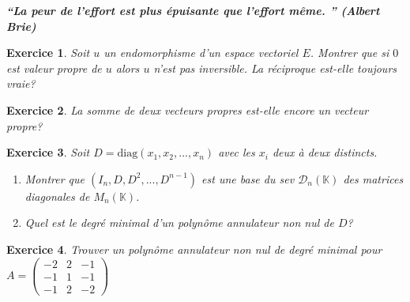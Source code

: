 \documentclass[12pt,a4paper]{article}
\newcommand{\K}{\mathbb{K} }
\newcommand{\diag}{\mathrm{diag}}
\theoremstyle{break}
\theoremstyle{break}
\newtheorem{Exo}{Exercice}
\begin{document}
\emph{\textbf{“La peur de l'effort est plus épuisante que l'effort même. ” (Albert Brie)}}



\begin{Exo}
Soit $u$ un endomorphisme d'un espace vectoriel $E$. Montrer que si $0$ est valeur propre de $u$ alors $u$ n'est pas inversible. La réciproque est-elle toujours vraie?
\end{Exo}


\begin{Exo}
	La somme de deux vecteurs propres est-elle encore un vecteur propre?
\end{Exo}



\begin{Exo}
	Soit $D=\diag(x_1,x_2,...,x_n)$ avec les $x_i$ deux à deux distincts.
	\begin{enumerate}
		\item
		Montrer que $(I_n,D,D^2,...,D^{n-1})$ est une base du sev $\mathcal{D}_n(\K)$ des matrices diagonales de $M_n(\K)$.
		\item
		Quel est le degré minimal d'un polynôme annulateur non nul de $D$?
	\end{enumerate}	
\end{Exo}

%	

\begin{Exo}
	Trouver un polynôme annulateur non nul de degré minimal pour $A=\begin{pmatrix}
	-2 & 2 & -1 \\
	-1 & 1 & -1 \\
	-1 & 2 & -2
	\end{pmatrix}$
\end{Exo}
\end{document}
